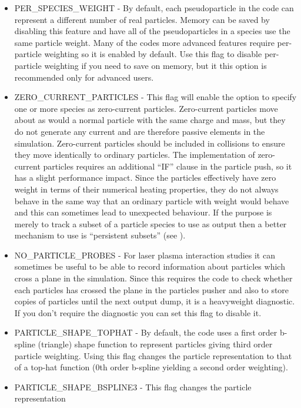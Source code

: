 \begin{itemize}
\item PER\_SPECIES\_WEIGHT - By default, each pseudoparticle in the code can
  represent a different number of real particles. Memory can be saved by
  disabling this feature and have all of the pseudoparticles in a species
  use the same particle weight. Many of the codes more advanced features
  require per-particle weighting so it is enabled by default.
  Use this flag to disable per-particle weighting if you need to save on
  memory, but it this option is recommended only for advanced users.
\item ZERO\_CURRENT\_PARTICLES - This flag will enable the option to specify one
  or more species as zero-current particles. Zero-current particles
  move about as would a normal particle with the same charge and mass, but
  they do not generate any current and are therefore passive
  elements in the simulation. Zero-current particles should be included in
  collisions to ensure they move identically to ordinary particles. The
  implementation of zero-current particles requires an additional ``IF'' clause
  in the particle push, so it has a slight performance impact.
  \warn Since the particles effectively have zero weight in terms
  of their numerical heating properties, they
  do not always behave in the same way that an ordinary particle with weight
  would behave and this can sometimes lead to unexpected behaviour. If the
  purpose is merely to track a subset of a particle species to use as output
  then a better mechanism to use is ``persistent subsets''
  (see ).
\item NO\_PARTICLE\_PROBES - For laser plasma interaction studies it can
  sometimes
  be useful to be able to record information about particles which cross a
  plane in the simulation. Since this requires the code to check whether each
  particles has crossed the plane in the particles pusher and also to store
  copies of particles until the next output dump, it is a heavyweight
  diagnostic. If you don't require the diagnostic you can set this flag to
  disable it.
\item PARTICLE\_SHAPE\_TOPHAT - By default, the code uses a first order
  b-spline (triangle) shape function to represent particles giving
  third order particle weighting.
  Using this flag changes the particle representation to that of a top-hat
  function (0th order b-spline yielding a second order weighting).
\item PARTICLE\_SHAPE\_BSPLINE3 - This flag changes the particle representation

\end{itemize}
